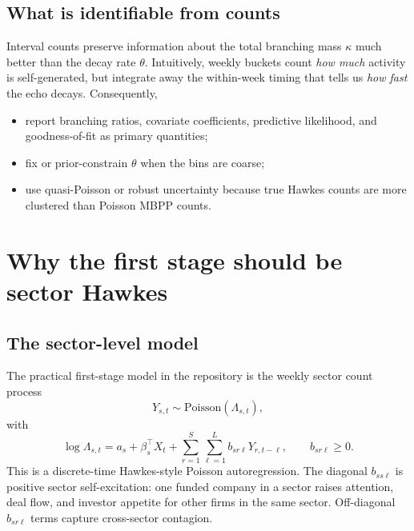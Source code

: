\documentclass[11pt]{article}
\theoremstyle{plain}
\theoremstyle{definition}
\theoremstyle{remark}
\begin{document}
\subsection{What is identifiable from counts}
Interval counts preserve information about the total branching mass $\kappa$ much better than the decay rate $\theta$. Intuitively, weekly buckets count \emph{how much} activity is self-generated, but integrate away the within-week timing that tells us \emph{how fast} the echo decays. Consequently,
\begin{itemize}[leftmargin=1.5em]
\item report branching ratios, covariate coefficients, predictive likelihood, and goodness-of-fit as primary quantities;
\item fix or prior-constrain $\theta$ when the bins are coarse;
\item use quasi-Poisson or robust uncertainty because true Hawkes counts are more clustered than Poisson MBPP counts.
\end{itemize}

\section{Why the first stage should be sector Hawkes}
\label{sec:sector}

\subsection{The sector-level model}
The practical first-stage model in the repository is the weekly sector count process
\begin{equation}
Y_{s,t}\sim\mathrm{Poisson}(\Lambda_{s,t}),
\end{equation}
with
\begin{equation}
\log\Lambda_{s,t}
=a_s+\beta_s^\top X_t+\sum_{r=1}^{S}\sum_{\ell=1}^{L}b_{sr\ell}Y_{r,t-\ell},
\qquad b_{sr\ell}\ge0.
\label{eq:sector_glm}
\end{equation}
This is a discrete-time Hawkes-style Poisson autoregression. The diagonal $b_{ss\ell}$ is positive sector self-excitation: one funded company in a sector raises attention, deal flow, and investor appetite for other firms in the same sector. Off-diagonal $b_{sr\ell}$ terms capture cross-sector contagion.
\end{document}
